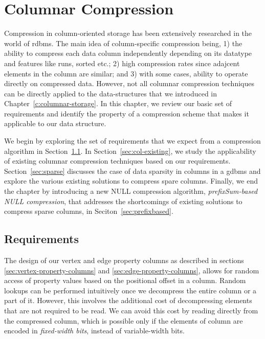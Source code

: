 \chapter{Columnar Compression}
\label{columnar-compression}

Compression in column-oriented storage has been extensively researched \cite{abadi-col-comp, abadi-sparse-col, boncz-comp} in the world of \gls{rdbms}. The main idea of column-specific compression being, 1) the ability to compress each data column independently depending on its datatype and features like runs, sorted etc.; 2) high compression rates since adajcent elements in the column are similar; and 3) with some cases, ability to operate directly on compressed data. However, not all columnar compression techniques can be directly applied to the data-structures that we introduced in Chapter~\ref{c:columnar-storage}. In this chapter, we review our basic set of requirements and identify the property of a compression scheme that makes it applicable to our data structure.

We begin by exploring the set of requirements that we expect from a compression algorithm in Section~\ref{sec:col-requirements}. In Section~\ref{sec:col-existing}, we study the applicability of existing columnar compression techniques based on our requirements. Section~\ref{sec:sparse} discusses the case of data sparsity in columns in a \gls{gdbms} and explore the various existing solutions to compress spare columns. Finally, we end the chapter by introducing a new NULL compression algorithm, \emph{prefixSum-based NULL compression}, that addresses the shortcomings of existing solutions to compress sparse columns, in Seciton~\ref{sec:prefixbased}.

\section{Requirements}
\label{sec:col-requirements}

The design of our vertex and edge property columns as described in sections \ref{sec:vertex-property-columns} and \ref{sec:edge-property-columns}, allows for random access of property values based on the positional offset in a column. Random lookups can be performed intuitively once we decompress the entire column or a part of it. However, this involves the additional cost of decompressing elements that are not required to be read. We can avoid this cost by reading directly from the compressed column, which is possible only if the elements of column are encoded in \emph{fixed-width bits}, instead of variable-width bits.

